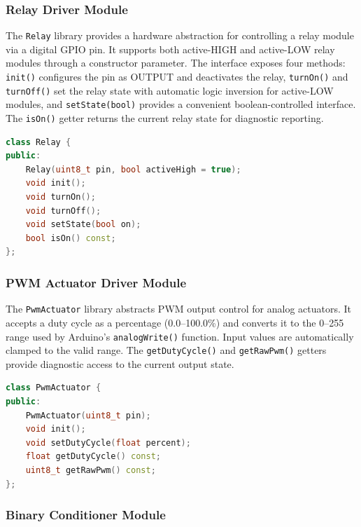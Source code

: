\subsubsection{Relay Driver Module}

The \texttt{Relay} library provides a hardware abstraction for controlling a relay module via a digital GPIO pin. It supports both active-HIGH and active-LOW relay modules through a constructor parameter. The interface exposes four methods: \texttt{init()} configures the pin as OUTPUT and deactivates the relay, \texttt{turnOn()} and \texttt{turnOff()} set the relay state with automatic logic inversion for active-LOW modules, and \texttt{setState(bool)} provides a convenient boolean-controlled interface. The \texttt{isOn()} getter returns the current relay state for diagnostic reporting.

\begin{lstlisting}[language=C++, caption={Relay driver interface (Relay.h)}]
class Relay {
public:
    Relay(uint8_t pin, bool activeHigh = true);
    void init();
    void turnOn();
    void turnOff();
    void setState(bool on);
    bool isOn() const;
};
\end{lstlisting}

\subsubsection{PWM Actuator Driver Module}

The \texttt{PwmActuator} library abstracts PWM output control for analog actuators. It accepts a duty cycle as a percentage (0.0--100.0\%) and converts it to the 0--255 range used by Arduino's \texttt{analogWrite()} function. Input values are automatically clamped to the valid range. The \texttt{getDutyCycle()} and \texttt{getRawPwm()} getters provide diagnostic access to the current output state.

\begin{lstlisting}[language=C++, caption={PWM actuator driver interface (PwmActuator.h)}]
class PwmActuator {
public:
    PwmActuator(uint8_t pin);
    void init();
    void setDutyCycle(float percent);
    float getDutyCycle() const;
    uint8_t getRawPwm() const;
};
\end{lstlisting}

\subsubsection{Binary Conditioner Module}

